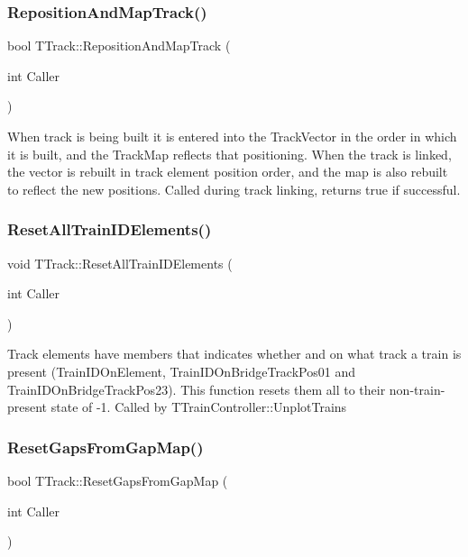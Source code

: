 \subsubsection{\texorpdfstring{Reposition\+And\+Map\+Track()}{RepositionAndMapTrack()}}
{\footnotesize\ttfamily bool T\+Track\+::\+Reposition\+And\+Map\+Track (\begin{DoxyParamCaption}\item[{int}]{Caller }\end{DoxyParamCaption})}

When track is being built it is entered into the Track\+Vector in the order in which it is built, and the Track\+Map reflects that positioning. When the track is linked, the vector is rebuilt in track element position order, and the map is also rebuilt to reflect the new positions. Called during track linking, returns true if successful. \mbox{\label{class_t_track_a9430d0a48a27e59f41015c5812aa5de2}} 
\subsubsection{\texorpdfstring{Reset\+All\+Train\+I\+D\+Elements()}{ResetAllTrainIDElements()}}
{\footnotesize\ttfamily void T\+Track\+::\+Reset\+All\+Train\+I\+D\+Elements (\begin{DoxyParamCaption}\item[{int}]{Caller }\end{DoxyParamCaption})}

Track elements have members that indicates whether and on what track a train is present (Train\+I\+D\+On\+Element, Train\+I\+D\+On\+Bridge\+Track\+Pos01 and Train\+I\+D\+On\+Bridge\+Track\+Pos23). This function resets them all to their non-\/train-\/present state of -\/1. Called by T\+Train\+Controller\+::\+Unplot\+Trains \mbox{\label{class_t_track_a1be0a43c6b1dc736d981fe7d883d7f01}} 
\subsubsection{\texorpdfstring{Reset\+Gaps\+From\+Gap\+Map()}{ResetGapsFromGapMap()}}
{\footnotesize\ttfamily bool T\+Track\+::\+Reset\+Gaps\+From\+Gap\+Map (\begin{DoxyParamCaption}\item[{int}]{Caller }\end{DoxyParamCaption})}

